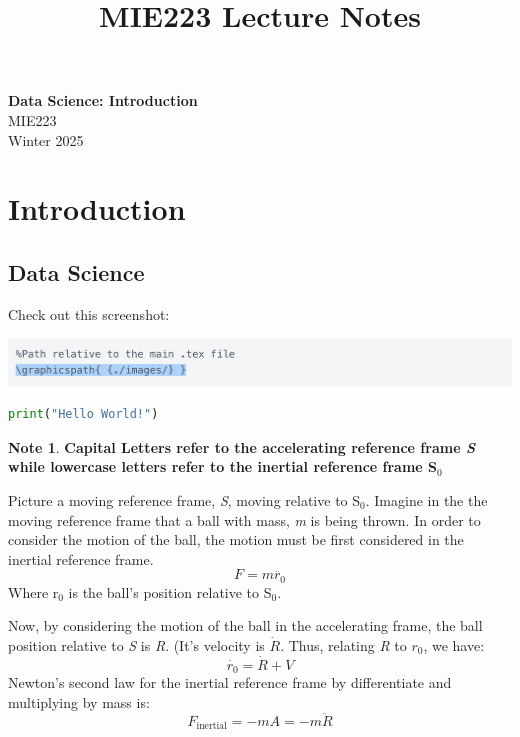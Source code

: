 \documentclass[11pt]{article}
\theoremstyle{definition}
\newtheorem{note}{Note}
\begin{document}
\setcounter{section}{0}
\title{MIE223 Lecture Notes}

\thispagestyle{empty}

\begin{center}
{\LARGE \bf Data Science: Introduction}\\
{\large MIE223}\\
Winter 2025
\end{center}
\section{Introduction}
\subsection{Data Science}
Check out this screenshot:

\includegraphics[width=\textwidth]{1.png}
\begin{lstlisting}[language=Python]
    print("Hello World!")
\end{lstlisting}
\begin{note}
\textbf{Capital Letters refer to the accelerating reference frame \textit{S} while lowercase letters refer to the inertial reference frame S$_0$}
\end{note}
Picture a moving reference frame, \textit{S}, moving relative to S$_0$. Imagine in the the moving reference frame that a ball with mass, \textit{m} is being thrown. 
In order to consider the motion of the ball, the motion must be first considered in the inertial reference frame. 
\begin{equation}
F = m\ddot{r_0}
\end{equation}
Where r$_0$ is the ball's position relative to S$_0$. 

Now, by considering the motion of the ball in the accelerating frame, the ball position relative to \textit{S} is \textit{R}. (It's velocity is $\dot{R}$. 
Thus, relating \textit{R} to $r_0$, we have: 
\begin{equation}
\dot{r_0} = \dot{R} + V
\end{equation}
Newton's second law for the inertial reference frame by differentiate and multiplying by mass is:
\begin{equation}
F_{\text{inertial}} = -mA = -m\ddot{R}
\end{equation}
\newpage
\end{document}
